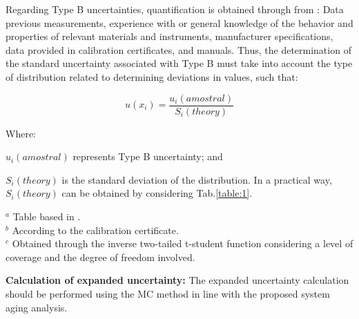 \documentclass{ws-m3as}
\begin{document}
\begin{romanlist}[(ii)]
Regarding Type B uncertainties, quantification is obtained through from \cite{GUN2008}: Data previous measurements, experience with or general knowledge of the behavior and properties of relevant materials and instruments, manufacturer specifications, data provided in calibration certificates, and manuals. Thus, the determination of the standard uncertainty associated with Type B must take into account the type of distribution related to determining deviations in values, such that:

\begin{equation} \label{eq:4.3}
u(x_{i})= \frac{u_ i \left(amostral \right)} {S_i \left( theory \right)}
\end{equation}

Where:

\begin{itemlist}
\item $u_ i\left(amostral\right)$ represents Type B uncertainty; and 
\item $S_i \left( theory\right)$ is the standard deviation of the distribution. In a practical way, $S_i \left( theory\right)$ can be obtained by considering Tab.\ref{table:1}.

\begin{table}[H] 
	\caption{Type B Standard-Uncertainty$^{a}$}
	\label{table:1}
	\begin{center}
	\end{center}
	\footnotesize{$^{a}$ Table based in \protect\cite{GUN2008}.}\\
	\footnotesize{$^{b}$ According to the calibration certificate.}\\
	\footnotesize{$^{c}$ Obtained through the inverse two-tailed t-student function considering a level of coverage and the degree of freedom involved.}
\end{table}
\end{itemlist}

\item \textbf{Calculation of expanded uncertainty:} The expanded uncertainty calculation should be performed using the MC method in line with the proposed system aging analysis.

\end{romanlist}
\end{document}
